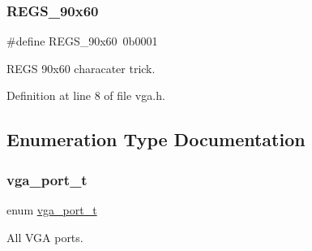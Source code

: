 \subsubsection{\texorpdfstring{R\+E\+G\+S\+\_\+90x60}{REGS\_90x60}}
{\footnotesize\ttfamily \#define R\+E\+G\+S\+\_\+90x60~0b0001}



R\+E\+GS 90x60 characater trick. 



Definition at line 8 of file vga.\+h.



\subsection{Enumeration Type Documentation}
\mbox{\label{a00008_a63bf0a876af36076ffb713ff00618ce4_a63bf0a876af36076ffb713ff00618ce4}} 
\subsubsection{\texorpdfstring{vga\+\_\+port\+\_\+t}{vga\_port\_t}}
{\footnotesize\ttfamily enum \hyperlink{a00008_a63bf0a876af36076ffb713ff00618ce4_a63bf0a876af36076ffb713ff00618ce4}{vga\+\_\+port\+\_\+t}}



All V\+GA ports. 

